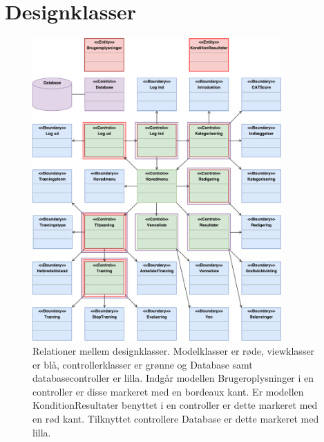 \chapter{Designklasser} \label{bilagA}

\begin{figure} [H]
\centering
\includegraphics[width=0.85\textwidth]{figures/MVC/Designklasse}
\caption{Relationer mellem designklasser. Modelklasser er røde, viewklasser er blå, controllerklasser er grønne og  Database samt databasecontroller er lilla. Indgår modellen Brugeroplysninger i en controller er disse markeret med en bordeaux kant. Er modellen KonditionResultater benyttet i en controller er dette markeret med en rød kant. Tilknyttet controllere Database er dette markeret med lilla. }
\label{fig:Designklasser}
\end{figure}